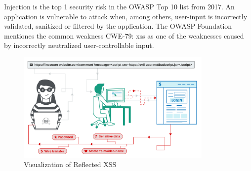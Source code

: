 
Injection is the top 1 security risk in the OWASP Top 10 list from 2017.
An application is vulnerable to attack when, among others, user-input is incorrectly validated, sanitized or filtered by the application.
The OWASP Foundation mentiones the common weakness CWE-79: \acrfull{xss} as one of the weaknesses caused by incorrectly neutralized user-controllable input. \cite{OWASP/Risks2017,OWASP/Injection}

\begin{figure}
	\centering
	\includegraphics[width=0.85\textwidth]{reflxss.png}
	\caption{Visualization of Reflected XSS \cite{portswigger/reflxss}}
	\label{fig:reflxss}
\end{figure}

